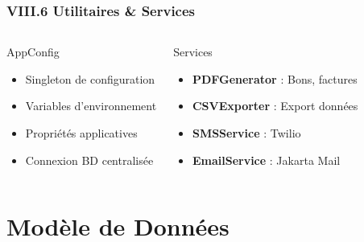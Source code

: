 \documentclass[11pt, aspectratio=169]{beamer}
\begin{document}
\begin{frame}
    \frametitle{VIII.6 Utilitaires \& Services}
    
    \begin{columns}[T]
        \begin{block}{AppConfig}
            \begin{itemize}
                \item Singleton de configuration
                \item Variables d'environnement
                \item Propriétés applicatives
                \item Connexion BD centralisée
            \end{itemize}
        \end{block}
        
        \begin{block}{Services}
            \begin{itemize}
                \item \textbf{PDFGenerator} : Bons, factures
                \item \textbf{CSVExporter} : Export données
                \item \textbf{SMSService} : Twilio
                \item \textbf{EmailService} : Jakarta Mail
            \end{itemize}
        \end{block}
    \end{columns}
\end{frame}


\section{Modèle de Données}
\end{document}
